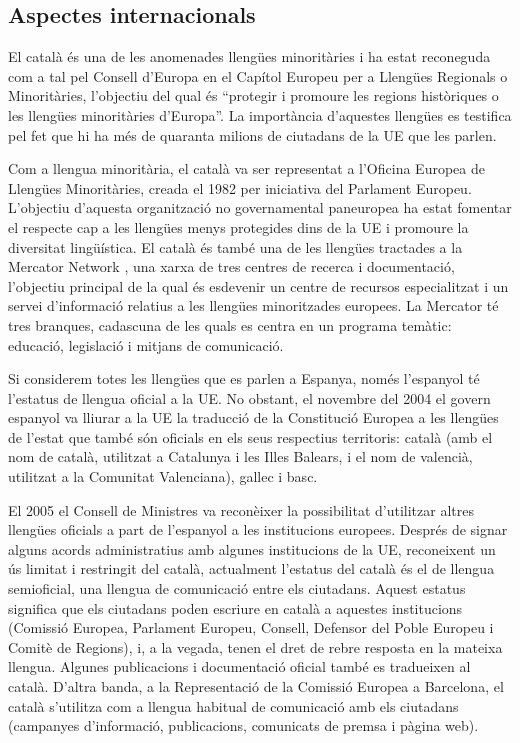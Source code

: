 \begin{multicols}{2}
\subsection{Aspectes internacionals}

El català és una de les anomenades llengües minoritàries i ha estat reconeguda com a tal pel Consell d’Europa en el Capítol Europeu per a Llengües Regionals o Minoritàries, l’objectiu del qual és “protegir i promoure les regions històriques o les llengües minoritàries d’Europa”. La importància d’aquestes llengües es testifica pel fet que hi ha més de quaranta milions de ciutadans de la UE que les parlen.

Com a llengua minoritària, el català va ser representat a l’Oficina Europea de Llengües Minoritàries, creada el 1982 per iniciativa del Parlament Europeu. L’objectiu d’aquesta organització no governamental paneuropea ha estat fomentar el respecte cap a les llengües menys protegides dins de la UE i promoure la diversitat lingüística. El català és també una de les llengües tractades a la Mercator Network \cite{CAT-Nota8}, una xarxa de tres centres de recerca i documentació, l’objectiu principal de la qual és esdevenir un centre de recursos especialitzat i un servei d’informació relatius a les llengües minoritzades europees. La Mercator té tres branques, cadascuna de les quals es centra en un programa temàtic: educació, legislació i mitjans de comunicació.  

Si considerem totes les llengües que es parlen a Espanya, només l’espanyol té l’estatus de llengua oficial a la UE. No obstant, el novembre del 2004 el govern espanyol va lliurar a la UE la traducció de la Constitució Europea a les llengües de l’estat que també són oficials en els seus respectius territoris: català (amb el nom de català, utilitzat a Catalunya i les Illes Balears, i el nom de valencià, utilitzat a la Comunitat Valenciana), gallec i basc.

El 2005 el Consell de Ministres va reconèixer la possibilitat d’utilitzar altres llengües oficials a part de l’espanyol a les institucions europees. Després de signar alguns acords administratius amb algunes institucions de la UE, reconeixent un ús limitat i restringit del català, actualment l’estatus del català és el de llengua semioficial, una llengua de comunicació entre els ciutadans. Aquest estatus significa que els ciutadans poden escriure en català a aquestes institucions (Comissió Europea, Parlament Europeu, Consell, Defensor del Poble Europeu i Comitè de Regions), i, a la vegada, tenen el dret de rebre resposta en la mateixa llengua. Algunes publicacions i documentació oficial també es tradueixen al català. D’altra banda, a la Representació de la Comissió Europea a Barcelona, el català s’utilitza com a llengua habitual de comunicació amb els ciutadans (campanyes d’informació, publicacions, comunicats de premsa i pàgina web). 


\end{multicols}

